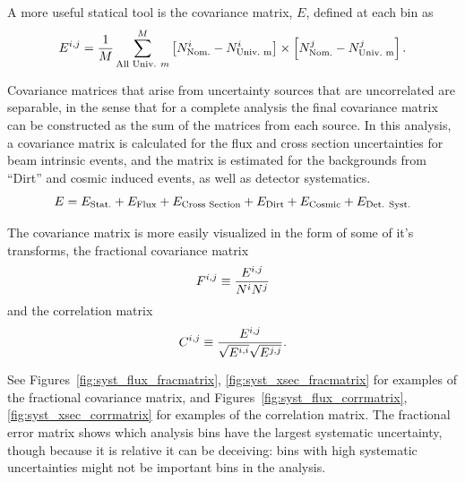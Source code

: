 A more useful statical tool is the covariance matrix, $E$, defined at each bin as
\begin{equation}
\begin{centering}
E^{i,j} = \frac{1}{M}\sum_{\text{All Univ.}~m}^{M} \left[ N^i_{\text{Nom.}} - N^i_{\text{Univ.~m}}\right] \times \left[ N^j_{\text{Nom.}} - N^j_{\text{Univ.~m}}\right].
\end{centering}
\label{eq:cov_mat}
\end{equation}

Covariance matrices that arise from uncertainty sources that are uncorrelated are separable, in the sense that for a complete analysis the final covariance matrix can be constructed as the sum of the matrices from each source.  In this analysis, a covariance matrix is calculated for the flux and cross section uncertainties for beam intrinsic events, and the matrix is estimated for the backgrounds from ``Dirt'' and cosmic induced events, as well as detector systematics.
\begin{equation}
\begin{centering}
E = E_{\text{Stat.}} + E_{\text{Flux}} + E_{\text{Cross Section}} + E_{\text{Dirt}} + E_{\text{Cosmic}} + E_{\text{Det. Syst.}}
\end{centering}
\end{equation}

The covariance matrix is more easily visualized in the form of some of it's transforms, the fractional covariance matrix
\begin{equation}
\begin{centering}
F^{i,j} \equiv \frac{E^{i,j}}{N^{i} N^{j}}
\end{centering}
\end{equation}
and the correlation matrix
\begin{equation}
\begin{centering}
C^{i,j} \equiv \frac{ E^{i,j} }{ \sqrt{E^{i,i}} \sqrt{E^{j,j}} }.
\end{centering}
\end{equation}

See Figures~\ref{fig:syst_flux_fracmatrix}, \ref{fig:syst_xsec_fracmatrix} for examples of the fractional covariance matrix, and Figures~\ref{fig:syst_flux_corrmatrix}, \ref{fig:syst_xsec_corrmatrix} for examples of the correlation matrix.  The fractional error matrix shows which analysis bins have the largest systematic uncertainty, though because it is relative it can be deceiving: bins with high systematic uncertainties might not be important bins in the analysis. 

